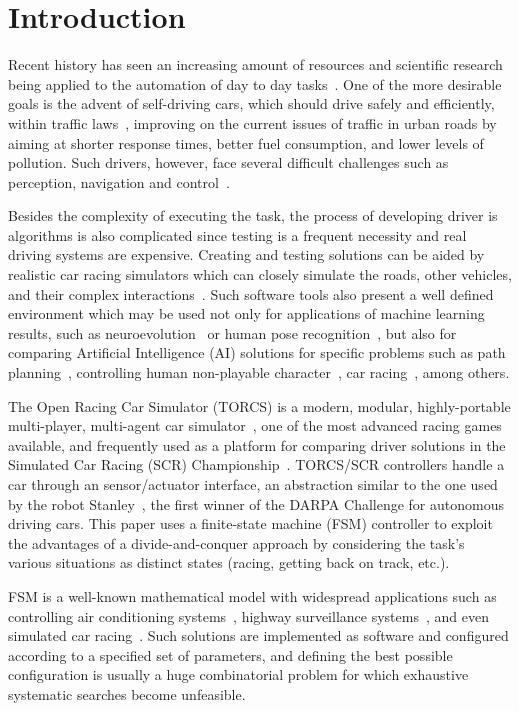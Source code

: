 \section{Introduction}\label{sec:1}
Recent history has seen an increasing amount of resources and scientific research being applied to the automation of day to day tasks~\cite{INDUS,APPLI}. One of the more desirable goals is the advent of self-driving cars, which should drive safely and efficiently, within traffic laws~\cite{SAFE,AUTOM}, improving on the current issues of traffic in urban roads by aiming at shorter response times, better fuel consumption, and lower levels of pollution. Such drivers, however, face several difficult challenges such as perception, navigation and control~\cite{6179503}.

Besides the complexity of executing the task, the process of developing driver is algorithms is also complicated since testing is a frequent necessity and real driving systems are expensive. Creating and testing solutions can be aided by realistic car racing simulators which can closely simulate the roads, other vehicles, and their complex interactions~\cite{caldeira2013torcs}. Such software  tools also present a well defined environment which may be used not only for applications of machine learning results, such as neuroevolution~\cite{5482132} or human pose recognition~\cite{Shotton:2011}, but also for comparing Artificial Intelligence (AI) solutions for specific problems such as path planning~\cite{deFreitas:2012}, controlling human non-playable character~\cite{simon2008}, car racing~\cite{2009}, among others.

The Open Racing Car Simulator (TORCS) is a modern, modular, highly-portable multi-player, multi-agent car simulator~\cite{TORCS}, one of the most advanced racing games available, and frequently used as a platform for comparing driver solutions in the Simulated Car Racing (SCR) Championship~\cite{2009,Loiacono:2012:LEA:2212908.2212953}. TORCS/SCR controllers handle a car through an sensor/actuator interface, an abstraction similar to the one used by the robot Stanley~\cite{Thrun2006}, the first winner of the DARPA Challenge for autonomous driving cars. This paper uses a finite-state machine (FSM) controller to exploit the advantages of a divide-and-conquer approach by considering the task's various situations as distinct states (racing, getting back on track, etc.).

FSM is a well-known mathematical model with widespread applications such as controlling air conditioning systems~\cite{BERNARD}, highway surveillance systems~\cite{DOHYUN}, and even simulated car racing~\cite{DIEGO}. Such solutions are implemented as software and configured according to a specified set of parameters, and defining the best possible configuration is usually a huge combinatorial problem for which exhaustive systematic searches become unfeasible.

